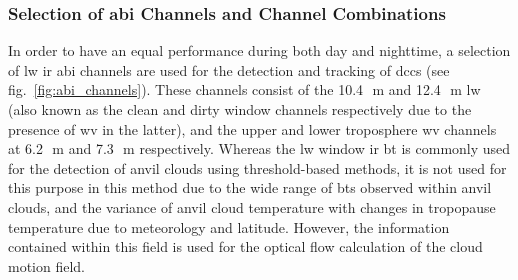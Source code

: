 \subsubsection{Selection of \acrshort{abi} Channels and Channel Combinations} \label{sec:abi_channels}

In order to have an equal performance during both day and nighttime, a selection of \acrshort{lw} \acrshort{ir} \acrshort{abi} channels are used for the detection and tracking of \acrshort{dcc}s (see fig.~\ref{fig:abi_channels}). 
These channels consist of the 10.4\,\unit{\mu m} and 12.4\,\unit{\mu m} \acrshort{lw} (also known as the clean and dirty window channels respectively due to the presence of \acrshort{wv} in the latter), and the upper and lower troposphere \acrshort{wv} channels at 6.2\,\unit{\mu m} and 7.3\,\unit{\mu m} respectively.
Whereas the \acrshort{lw} window \acrshort{ir} \acrshort{bt} is commonly used for the detection of anvil clouds using threshold-based methods, it is not used for this purpose in this method due to the wide range of \acrshort{bt}s observed within anvil clouds, and the variance of anvil cloud temperature with changes in tropopause temperature due to meteorology and latitude.
However, the information contained within this field is used for the optical flow calculation of the cloud motion field.


